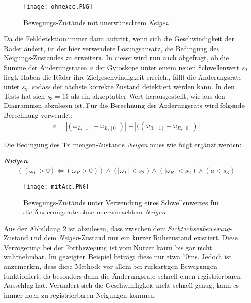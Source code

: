 \begin{figure}[h]
    \centering
    \texttt{[image: ohneAcc.PNG]}
    \caption{Bewegungs-Zustände mit unerwünschtem \textit{Neigen}}
    \label{fig:ohneAcc}
\end{figure}

Da die Fehldetektion immer dann auftritt, wenn sich die Geschwindigkeit der Räder ändert, ist der hier verwendete Lösungsansatz, die Bedingung des Neigungs-Zustandes zu erweitern.
In dieser wird nun auch abgefragt, ob die Summe der Änderungsraten $a$ der Gyroskope unter einem neuen Schwellenwert $s_3$ liegt.
Haben die Räder ihre Zielgeschwindigkeit erreicht, fällt die Änderungsrate unter $s_3$, sodass der nächste korrekte Zustand detektiert werden kann.
In den Tests hat sich $s_3 = 15$ als ein akzeptabler Wert herausgestellt, wie aus den Diagrammen abzulesen ist.
Für die Berechnung der Änderungsrate wird folgende Berechnung verwendet:
\begin{align}
    a = |(\omega_{L,[1]} - \omega_{L,[0]})| + |((\omega_{R,[1]} - \omega_{R,[0]})|
\end{align}

Die Bedingung des Teilmengen-Zustands \textit{Neigen} muss wie folgt ergänzt werden:

\textbf{\textit{Neigen}}
\begin{align}
    ((\omega_L > 0) \Leftrightarrow (\omega_R > 0)) \land (|\omega_L| < s_2) \land (|\omega_R| < s_2) \land (a < s_3)
\end{align}


\begin{figure}[h]
    \centering
    \texttt{[image: mitAcc.PNG]}
    \caption{Bewegungs-Zustände unter Verwendung eines Schwellenwertes für die Änderungsrate ohne unerwünschtem \textit{Neigen}}
    \label{fig:mitAcc}
\end{figure}

Aus der Abbildung \ref{fig:mitAcc} ist abzulesen, dass zwischen dem \textit{Sichtachsenbewegung}-Zustand und dem \textit{Neigen}-Zustand nun ein kurzer Ruhezustand existiert.
Diese Verzögerung bei der Fortbewegung ist vom Nutzer kaum bis gar nicht wahrnehmbar.
Im gezeigten Beispiel beträgt diese nur etwa 70ms.
Jedoch ist anzumerken, dass diese Methode vor allem bei ruckartigen Bewegungen funktioniert, da besonders dann die Änderungsrate schnell einen registrierbaren Ausschlag hat.
Verändert sich die Geschwindigkeit nicht schnell genug, kann es immer noch zu registrierbaren Neigungen kommen.


